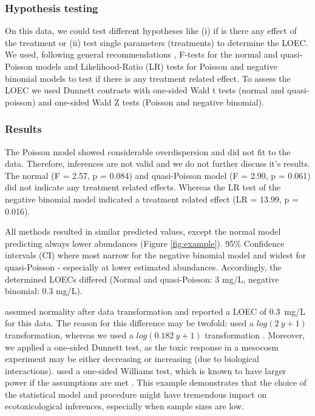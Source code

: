 \documentclass{scrartcl}
\begin{document}
\subsubsection{Hypothesis testing}

On this data, we could test different hypotheses like (i) if is there any effect of the treatment or (ii) test single parameters (treatments) to determine the LOEC.
We used, following general recommendations \citep{bolker_generalized_2009}, F-tests for the normal and quasi-Poisson models and Likelihood-Ratio (LR) tests for Poisson and negative binomial models to test if there is any treatment related effect.
To assess the LOEC we used Dunnett contrasts with one-sided Wald t tests (normal and quasi-poisson) and one-sided Wald Z tests (Poisson and negative binomial).


\subsubsection{Results}
The Poisson model showed considerable overdispersion and did not fit to the data. Therefore, inferences are not valid and we do not further discuss it's results. 
The normal (F = 2.57, p = 0.084) and quasi-Poisson model (F = 2.90, p = 0.061) did not indicate any treatment related effects.
Whereas the LR test of the negative binomial model indicated a treatment related effect (LR = 13.99, p = 0.016).

All methods resulted in similar predicted values, except the normal model predicting always lower abundances (Figure \ref{fig:example}). 
95\% Confidence intervals (CI) where most narrow for the negative binomial model and widest for quasi-Poisson - especially at lower estimated abundances.
Accordingly, the determined LOECs differed (Normal and quasi-Poisson: 3 mg/L, negative binomial: 0.3 mg/L).

\citet{brock_minimum_2014} assumed normality after data transformation and reported a LOEC of \mbox{0.3 mg/L} for this data.
The reason for this difference may be twofold: \citep{brock_minimum_2014} used a $log(2~y + 1)$ transformation, whereas we used a $log(0.182~y + 1)$ transformation \citep{van_den_brink_impact_2000}.
Moreover, we applied a one-sided Dunnett test, as the toxic response in a mesocosm experiment may be either decreasing or increasing (due to biological interactions).
\citet{brock_minimum_2014} used a one-sided Williams test, which is known to have larger power if the assumptions are met \citep{jaki_statistical_2013}.
This example demonstrates that the choice of the statistical model and procedure might have tremendous impact on ecotoxicological inferences, especially when sample sizes are low.
\end{document}
